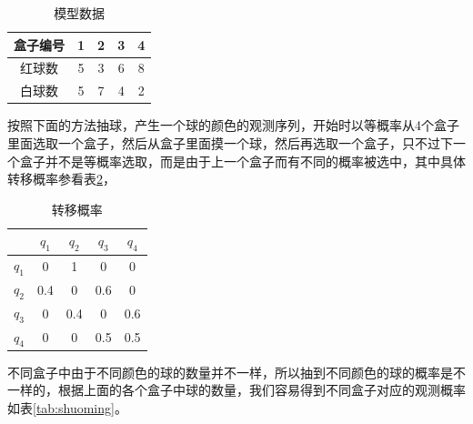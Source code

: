 \documentclass[a4paper,12pt]{ctexart}     %
\begin{document}
	
	\begin{table}[htbp]\songti{} 
		\begin{center}
			\renewcommand\arraystretch{2}         %
			\caption{模型数据 \label{tab:hezi}} 
			{  %
				
				\begin{tabular}{|c|c|c|c|c|}\hline   %
					
					\small 盒子编号&1&2&3&4\\\hline   %
					红球数&5&3&6&8\\\hline
					白球数&5&7&4&2\\\hline
				\end{tabular}
			}
		\end{center}
	\end{table}
	
	按照下面的方法抽球，产生一个球的颜色的观测序列，开始时以等概率从4个盒子里面选取一个盒子，然后从盒子里面摸一个球，然后再选取一个盒子，只不过下一个盒子并不是等概率选取，而是由于上一个盒子而有不同的概率被选中，其中具体转移概率参看表\ref{tab:zhuanyi}，


	
	\begin{center}
		{   %
			\begin{longtable}{|c|c|c|c|c|} \caption{\label{tab:zhuanyi}转移概率}\\ \hline\songti\zihao{5}\renewcommand\arraystretch{1.5} %
					\small &$ q_1 $ &$ q_2 $&$ q_3 $&$ q_4 $\\\hline   %
					$ q_1 $&0&1&0&0\\\hline
					$ q_2 $&0.4&0&0.6&0\\\hline
					$ q_3 $&0&0.4&0&0.6\\\hline
					$ q_4 $&0&0&0.5&0.5\\\hline
			\end{longtable} 
		}
	\end{center}	
	

	不同盒子中由于不同颜色的球的数量并不一样，所以抽到不同颜色的球的概率是不一样的，根据上面的各个盒子中球的数量，我们容易得到不同盒子对应的观测概率如表\ref{tab:shuoming}。  
	
\end{document}
